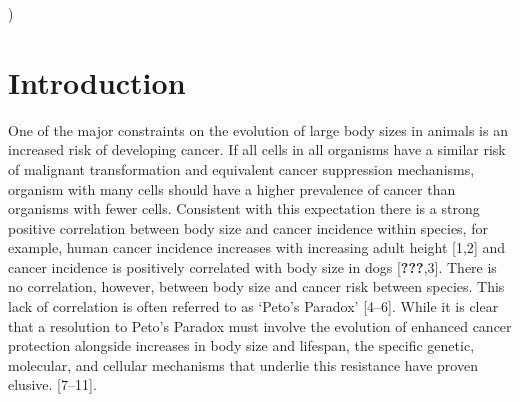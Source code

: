 \documentclass[10pt,letterpaper]{article}
\begin{document}
\linenumbers

)

\hypertarget{introduction}{%
\section{Introduction}\label{introduction}}

One of the major constraints on the evolution of large body sizes in
animals is an increased risk of developing cancer. If all cells in all
organisms have a similar risk of malignant transformation and equivalent
cancer suppression mechanisms, organism with many cells should have a
higher prevalence of cancer than organisms with fewer cells. Consistent
with this expectation there is a strong positive correlation between
body size and cancer incidence within species, for example, human cancer
incidence increases with increasing adult height {[}1,2{]} and cancer
incidence is positively correlated with body size in dogs
{[}{\textbf{???}},3{]}. There is no correlation, however, between body
size and cancer risk between species. This lack of correlation is often
referred to as `Peto's Paradox' {[}4--6{]}. While it is clear that a
resolution to Peto's Paradox must involve the evolution of enhanced
cancer protection alongside increases in body size and lifespan, the
specific genetic, molecular, and cellular mechanisms that underlie this
resistance have proven elusive. {[}7--11{]}.
\end{document}
